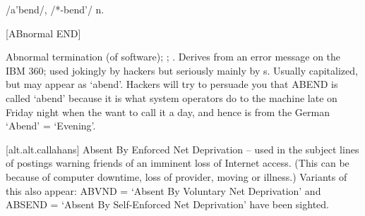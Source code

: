  /a'bend/, /*-bend'/ n.

[ABnormal END]
\begin{inparaenum}
	\item Abnormal termination (of software); ; . Derives from an error message on the IBM 360;
		used jokingly by hackers but seriously mainly by s. Usually capitalized, but may appear as `abend'.
		Hackers will try to persuade you that ABEND is called `abend' because it is what system operators do to the machine late on Friday
		night when the want to call it a day, and hence is from the German `Abend' = `Evening'.
	\item {[}alt.alt.callahans] Absent By Enforced Net Deprivation -- used in the subject lines of postings warning friends of an
		imminent loss of Internet access. (This can be because of computer downtime, loss of provider, moving or illness.) Variants of this
		also appear: ABVND = `Absent By Voluntary Net Deprivation' and ABSEND = `Absent By Self-Enforced Net Deprivation' have been
		sighted.
\end{inparaenum}

